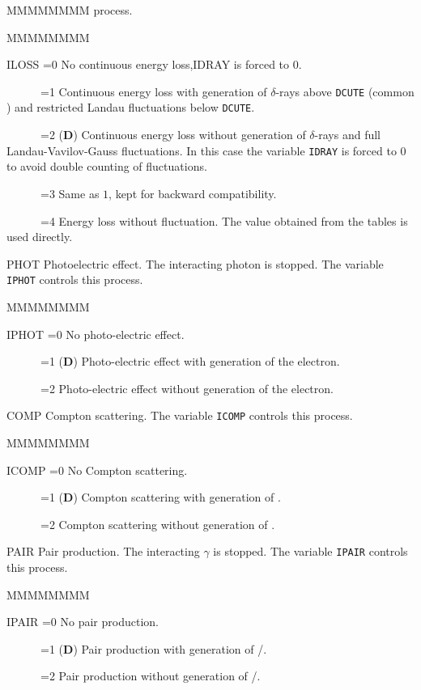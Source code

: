 \begin{DLtt}{MMMMMMMM}
process.
\begin{DLtt}{MMMMMMMM}
\item[ILOSS =0] No continuous energy loss,IDRAY is forced to 0.
\item[~~~~~~=1] Continuous energy loss with generation of $\delta$-rays 
above {\tt DCUTE} (common ) and
restricted Landau fluctuations below {\tt DCUTE}.
\item[~~~~~~=2] ({\bf D}) Continuous energy loss without generation of 
$\delta$-rays
and full Landau-Vavilov-Gauss fluctuations. In this case the variable {\tt IDRAY}
is forced to $0$ to avoid double counting of fluctuations.
\item[~~~~~~=3] Same as $1$, kept for backward compatibility.
\item[~~~~~~=4] Energy loss without fluctuation. The value obtained from the
tables is used directly.
\end{DLtt}
\item[PHOT] Photoelectric effect. The interacting photon is stopped.
The variable {\tt IPHOT} controls this process.
\begin{DLtt}{MMMMMMMM}
\item[IPHOT =0] No photo-electric effect.
\item[~~~~~~=1] ({\bf D}) Photo-electric effect with generation of the electron.
\item[~~~~~~=2] Photo-electric effect without generation of the electron.
\end{DLtt}
\item[COMP] Compton scattering. The variable {\tt ICOMP} controls this process.
\begin{DLtt}{MMMMMMMM}
\item[ICOMP =0] No Compton scattering.
\item[~~~~~~=1] ({\bf D}) Compton scattering with generation of \Pem.
\item[~~~~~~=2] Compton scattering without generation of \Pem.
\end{DLtt}
\item[PAIR] Pair production. The interacting $\gamma$ is stopped.
The variable {\tt IPAIR} controls this process.
\begin{DLtt}{MMMMMMMM}
\item[IPAIR =0] No pair production.
\item[~~~~~~=1] ({\bf D}) Pair production with generation of \Pem/\Pep.
\item[~~~~~~=2] Pair production without generation of \Pem/\Pep.
\end{DLtt}

\end{DLtt}
